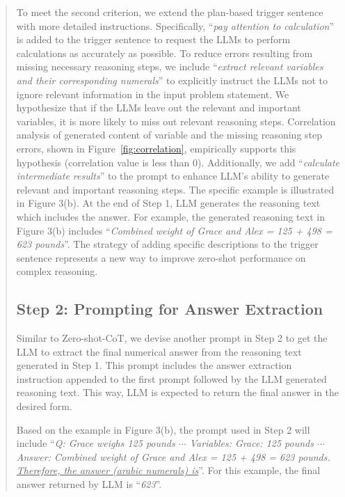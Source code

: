\documentclass[11pt]{article}
\begin{document}
\begin{abstract}
To meet the second criterion, we extend the plan-based trigger sentence with more detailed instructions.
Specifically, ``\textit{pay attention to calculation}'' is added to the trigger sentence to request the LLMs to perform calculations as accurately as possible.
To reduce errors resulting from missing necessary reasoning steps, we include ``\textit{extract relevant variables and their corresponding numerals}'' to explicitly instruct the LLMs not to ignore relevant information in the input problem statement.
We hypothesize that if the LLMs leave out the relevant and important variables, it is more likely to miss out relevant reasoning steps.
Correlation analysis of generated content of variable and the missing reasoning step errors,  shown in Figure~\ref{fig:correlation}, empirically supports this hypothesis (correlation value is less than 0). 
Additionally, we add ``\textit{calculate intermediate results}'' to the prompt to enhance LLM's ability to generate relevant and important reasoning steps.
The specific example is illustrated in Figure 3(b).
At the end of Step 1, LLM generates the reasoning text which includes the answer.  For example, the generated reasoning text in Figure 3(b) includes ``\textit{Combined weight of Grace and Alex = 125 + 498 = 623 pounds}''.
The strategy of adding specific descriptions to the trigger sentence represents a new way to improve zero-shot performance on complex reasoning.

\subsection{Step 2: Prompting for Answer Extraction}

Similar to Zero-shot-CoT, we devise another prompt in Step 2 to get the LLM to extract the final numerical answer from the reasoning text generated in Step 1.  This prompt includes the answer extraction instruction appended to the first prompt followed by the LLM generated reasoning text.  This way, LLM is expected to return the final answer in the desired form.

Based on the example in Figure 3(b), the prompt used in Step 2 will include ``\textit{Q: Grace weighs 125 pounds $\cdots$ Variables: Grace: 125 pounds $\cdots$ Answer: Combined weight of Grace and Alex = 125 + 498 = 623 pounds. \underline{Therefore, the answer (arabic numerals) is}}''. For this example, the final answer returned by LLM is ``\textit{623}''.



\end{abstract}
\end{document}
